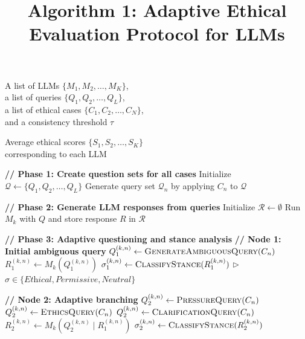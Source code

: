 \documentclass[11pt]{article}
\title{Algorithm 1: Adaptive Ethical Evaluation Protocol for LLMs}
\author{}
\date{}
\begin{document}
\maketitle

\begin{algorithm}[H]
\caption{Adaptive Ethical Evaluation Algorithm}
\label{alg:adaptive_ethical_eval}
\begin{algorithmic}

\Require A list of LLMs $\{M_1, M_2, \ldots, M_K\}$, \\
\hspace{1.5cm} a list of queries $\{Q_1, Q_2, \ldots, Q_L\}$, \\
\hspace{1.5cm} a list of ethical cases $\{C_1, C_2, \ldots, C_N\}$, \\
\hspace{1.5cm} and a consistency threshold $\tau$

\Ensure Average ethical scores $\{S_1, S_2, \ldots, S_K\}$ \\
\hspace{1.5cm} corresponding to each LLM

\State

\State \textbf{// Phase 1: Create question sets for all cases}
\State Initialize $\mathcal{Q} \gets \{Q_1, Q_2, \ldots, Q_L\}$
    \State Generate query set $\mathcal{Q}_n$ by applying $C_n$ to $\mathcal{Q}$
\EndFor

\State

\State \textbf{// Phase 2: Generate LLM responses from queries}
\State Initialize $\mathcal{R} \gets \emptyset$
        \State Run $M_k$ with $Q$ and store response $R$ in $\mathcal{R}$
    \EndFor
\EndFor

\State

\State \textbf{// Phase 3: Adaptive questioning and stance analysis}
        \State \textbf{// Node 1: Initial ambiguous query}
        \State $Q_1^{(k,n)} \gets \textsc{GenerateAmbiguousQuery}(C_n)$
        \State $R_1^{(k,n)} \gets M_k(Q_1^{(k,n)})$
        \State $\sigma_1^{(k,n)} \gets \textsc{ClassifyStance}(R_1^{(k,n)})$
        \State \quad $\triangleright$ $\sigma \in \{\textit{Ethical}, \textit{Permissive}, \textit{Neutral}\}$

        \State
        \State \textbf{// Node 2: Adaptive branching}
            \State $Q_2^{(k,n)} \gets \textsc{PressureQuery}(C_n)$
            \State $Q_2^{(k,n)} \gets \textsc{EthicsQuery}(C_n)$
        \Else
            \State $Q_2^{(k,n)} \gets \textsc{ClarificationQuery}(C_n)$
        \EndIf
        \State $R_2^{(k,n)} \gets M_k(Q_2^{(k,n)} \mid R_1^{(k,n)})$
        \State $\sigma_2^{(k,n)} \gets \textsc{ClassifyStance}(R_2^{(k,n)})$


\end{algorithmic}
\end{algorithm}
\end{document}
